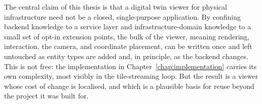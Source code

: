 The central claim of this thesis is that a digital twin viewer for physical infrastructure need not be a closed, single-purpose application. By confining backend knowledge to a service layer and infrastructure-domain knowledge to a small set of opt-in extension points, the bulk of the viewer, meaning rendering, interaction, the camera, and coordinate placement, can be written once and left untouched as entity types are added and, in principle, as the backend changes. This is not free: the implementation in Chapter~\ref{chap:implementation} carries its own complexity, most visibly in the tile-streaming loop. But the result is a viewer whose cost of change is localised, and which is a plausible basis for reuse beyond the project it was built for.
